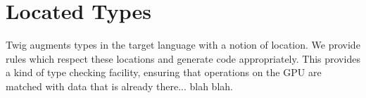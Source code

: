 
\section{Located Types}

Twig augments types in the target language with a notion of location. We provide
rules which respect these locations and generate code appropriately. This
provides a kind of type checking facility, ensuring that operations on the GPU
are matched with data that is already there... blah blah.
